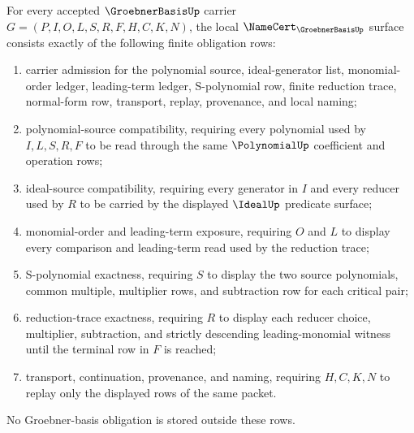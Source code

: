 
\begin{theorem}
\label{thm:groebner-basis-namecert-obligations}
For every accepted $\GroebnerBasisUp$ carrier $G=(P,I,O,L,S,R,F,H,C,K,N)$, the local $\NameCert_{\GroebnerBasisUp}$ surface consists exactly of the following finite obligation rows:
\begin{enumerate}
\item carrier admission for the polynomial source, ideal-generator list, monomial-order ledger, leading-term ledger, S-polynomial row, finite reduction trace, normal-form row, transport, replay, provenance, and local naming;
\item polynomial-source compatibility, requiring every polynomial used by $I,L,S,R,F$ to be read through the same $\PolynomialUp$ coefficient and operation rows;
\item ideal-source compatibility, requiring every generator in $I$ and every reducer used by $R$ to be carried by the displayed $\IdealUp$ predicate surface;
\item monomial-order and leading-term exposure, requiring $O$ and $L$ to display every comparison and leading-term read used by the reduction trace;
\item S-polynomial exactness, requiring $S$ to display the two source polynomials, common multiple, multiplier rows, and subtraction row for each critical pair;
\item reduction-trace exactness, requiring $R$ to display each reducer choice, multiplier, subtraction, and strictly descending leading-monomial witness until the terminal row in $F$ is reached;
\item transport, continuation, provenance, and naming, requiring $H,C,K,N$ to replay only the displayed rows of the same packet.
\end{enumerate}
No Groebner-basis obligation is stored outside these rows.
\end{theorem}
